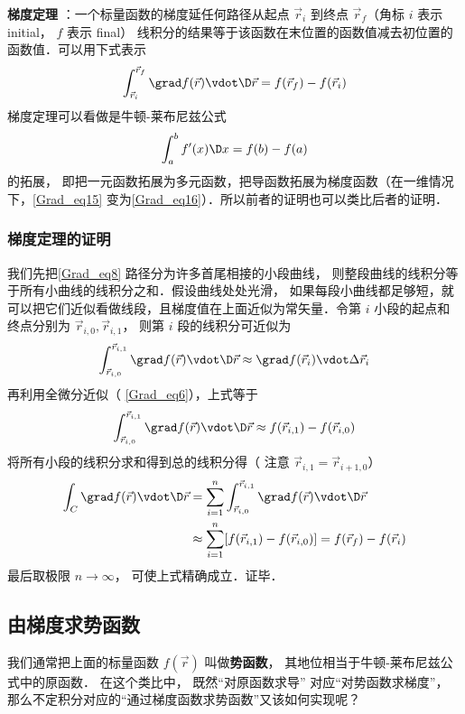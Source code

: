 \textbf{梯度定理} ：一个标量函数的梯度延任何路径从起点 $\vec r_i$ 到终点 $\vec r_f$（角标 $i$ 表示 initial， $f$ 表示 final）  线积分的结果等于该函数在末位置的函数值减去初位置的函数值．可以用下式表示
\begin{equation}\label{Grad_eq15}
\int_{\vec r_i}^{\vec r_f} \grad f(\vec r) \vdot \D \vec r = f(\vec r_f) - f(\vec r_i)
\end{equation}
梯度定理可以看做是牛顿-莱布尼兹公式
\begin{equation}\label{Grad_eq16}
\int_a^b {f'(x)\D x}  = f(b) - f(a)
\end{equation}
的拓展， 即把一元函数拓展为多元函数，把导函数拓展为梯度函数（在一维情况下，\autoref{Grad_eq15} 变为\autoref{Grad_eq16}）．所以前者的证明也可以类比后者的证明．

\subsubsection{梯度定理的证明}

我们先把\autoref{Grad_eq8} 路径分为许多首尾相接的小段曲线， 则整段曲线的线积分等于所有小曲线的线积分之和．假设曲线处处光滑， 如果每段小曲线都足够短，就可以把它们近似看做线段，且梯度值在上面近似为常矢量．令第 $i$ 小段的起点和终点分别为 $\vec r_{i,0}, \vec r_{i,1}$， 则第 $i$ 段的线积分可近似为
\begin{equation}
\int_{\vec r_{i,0}}^{\vec r_{i,1}} \grad f(\vec r) \vdot \D \vec r \approx  \grad f(\vec r_i) \vdot \Delta \vec r_i
\end{equation}
再利用全微分近似（ \autoref{Grad_eq6}），上式等于
\begin{equation}
\int_{\vec r_{i,0}}^{\vec r_{i,1}} \grad f(\vec r) \vdot \D \vec r \approx f(\vec r_{i,1}) - f(\vec r_{i,0})
\end{equation}
将所有小段的线积分求和得到总的线积分得（ 注意 $\vec r_{i,1} = \vec r_{i+1,0}$） 
\begin{equation}\begin{aligned}
\int_{C} \grad f(\vec r) \vdot \D \vec r
&= \sum_{i=1}^n \int_{\vec r_{i,0}}^{\vec r_{i,1}} \grad f(\vec r) \vdot \D \vec r\\
&\approx  \sum_{i=1}^n [f(\vec r_{i,1}) - f(\vec r_{i,0})] 
= f(\vec r_f) - f(\vec r_i)
\end{aligned}\end{equation}
最后取极限 $n\to \infty$， 可使上式精确成立．证毕．

\subsection{由梯度求势函数}
我们通常把上面的标量函数 $f(\vec r)$ 叫做\textbf{势函数}， 其地位相当于牛顿-莱布尼兹公式中的原函数． 在这个类比中， 既然“对原函数求导” 对应“对势函数求梯度”， 那么不定积分对应的“通过梯度函数求势函数”又该如何实现呢？

